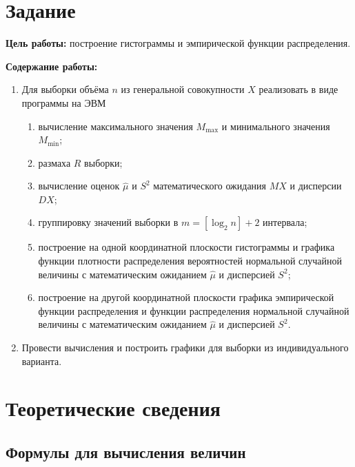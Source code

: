 \documentclass[12pt]{report}
\begin{document}
\renewcommand{\thefigure}{\thesection.\arabic{figure}}
\renewcommand{\thetable}{\thesection.\arabic{table}}
\renewcommand{\thelstlisting}{\thesection.\arabic{lstlisting}}


\renewcommand*\thesection{\arabic{section}}


\section{Задание}

\textbf{Цель работы:} построение гистограммы и эмпирической функции распределения.

\textbf{Содержание работы:}
\begin{enumerate}
    \item Для выборки объёма $n$ из генеральной совокупности $X$ реализовать в виде программы на ЭВМ
        \begin{enumerate}
            \item вычисление максимального значения $M_{\max}$ и минимального значения $M_{\min}$;
            \item размаха $R$ выборки;
            \item вычисление оценок $\hat\mu$ и $S^2$ математического ожидания $MX$ и дисперсии $DX$;
            \item группировку значений выборки в $m = [\log_2 n] + 2$ интервала;
            \item построение на одной координатной плоскости гистограммы и графика функции плотности распределения вероятностей нормальной случайной величины с математическим ожиданием $\hat{\mu}$ и дисперсией $S^2$;
            \item построение на другой координатной плоскости графика эмпирической функции распределения и функции распределения нормальной случайной величины с математическим ожиданием $\hat{\mu}$ и дисперсией $S^2$.
        \end{enumerate}
    \item Провести вычисления и построить графики для выборки из индивидуального варианта.
\end{enumerate}

\section{Теоретические сведения}

\subsection{Формулы для вычисления величин}
\end{document}
